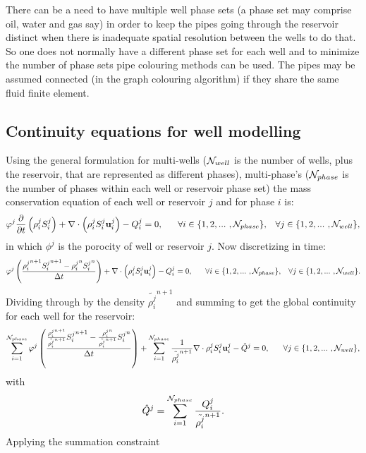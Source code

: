There can be a need to have multiple well phase sets (a phase set may comprise oil, water and gas say)
in order to keep the
pipes going through the reservoir distinct when there is inadequate spatial resolution
between the wells to do that. So one does not normally have a different phase set for each well and to minimize the
number of phase sets pipe colouring methods can be used. The pipes may be assumed connected (in the graph colouring algorithm) if they share the same fluid finite element.


\subsection{Continuity equations for well modelling}
\label{Continuity equation for well modelling}
Using the general formulation for multi-wells (${\cal N}_{well}$ is the number of wells, plus the reservoir,
that are represented as different phases), multi-phase's (${\cal N}_{phase}$ is the number of phases within each well or reservoir phase set) the mass conservation equation of each well or reservoir $j$ and for phase $i$ is:
\begin{equation}
\phi^j \displaystyle\frac{\partial}{\partial t}\left( \rho_{i}^{j}S_i^{j}\right) + \nabla\cdot\left(\rho_{i}^{j}S_i^{j}\mathbf{u}_i^{j}\right) - Q_{i}^j = 0,
~~~~~ \forall i \in\{ 1,2,...~ , {\cal N}_{phase}\}, \;\;\;
\forall j \in\{ 1,2,...~ , {\cal N}_{well} \},
\label{saturation_wells_1}
\end{equation}
in which $\phi^j$ is the porocity of well or reservoir $j$.
Now discretizing in time:
\begin{equation}
\phi^j \displaystyle \left( \frac{
 {\rho_{i}^{j}}^{n+1} {S_i^{j}}^{n+1} - {\rho_{i}^{j}}^n {S_i^{j}}^n
}{\Delta t} \right) + \nabla\cdot\left(\rho_{i}^{j}S_i^{j}\mathbf{u}_i^{j}\right) - Q_{i}^j = 0,
~~~~~ \forall i \in\{ 1,2,...~ , {\cal N}_{phase}\}, \;\;\;
\forall j \in\{ 1,2,...~ , {\cal N}_{well} \}.
\label{saturation_wells_2}
\end{equation}
Dividing through by the density  $\tilde{\rho_{i}^{j}}^{n+1}$ and summing to get the global continuity for each well
for the reservoir:
\begin{equation}
\sum\limits_{i=1}^{{\cal N}_{phase}}
\phi^j
\left(  \frac{
 \frac{   {\rho_{i}^{j}}^{n+1} }
{  \tilde{\rho_{i}^{j}}^{n+1}  }
{S_i^{j}}^{n+1}
-
\frac{ {\rho_{i}^{j}}^{n} }
{  \tilde{\rho_{i}^{j}}^{n+1}  }
{S_i^{j}}^n
}
{\Delta t}
\right)
+
\sum\limits_{i=1}^{{\cal N}_{phase}}
\frac{1}{  \tilde{\rho_{i}^{j}}^{n+1}   }
\nabla\cdot\rho_{i}^{j}S_i^{j}\mathbf{u}_i^{j}
- \hat Q^j = 0,
~~~~~ \forall j \in\{ 1,2,...~ , {\cal N}_{well}\},
\label{saturation_wells_3}
\end{equation}
with
\begin{equation}
\hat Q^j= \sum\limits_{i=1}^{{\cal N}_{phase}} \frac{Q_i^j}{\tilde{\rho_{i}^{j}}^{n+1}}.
\label{saturation_wells_3b}
\end{equation}
Applying the summation constraint

